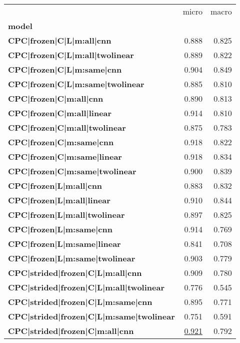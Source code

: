 \begin{adjustbox}{width=\textwidth}
\begin{tabular}{lrr}
\toprule
{} &  micro &  macro \\
\textbf{model                                               } &        &        \\
\midrule
\textbf{CPC|frozen|C|L|m:all|cnn               } &  0.888 &  0.825 \\
\textbf{CPC|frozen|C|L|m:all|twolinear         } &  0.889 &  0.822 \\
\textbf{CPC|frozen|C|L|m:same|cnn              } &  0.904 &  0.849 \\
\textbf{CPC|frozen|C|L|m:same|twolinear        } &  0.885 &  0.810 \\
\textbf{CPC|frozen|C|m:all|cnn                   } &  0.890 &  0.813 \\
\textbf{CPC|frozen|C|m:all|linear              } &  0.914 &  0.810 \\
\textbf{CPC|frozen|C|m:all|twolinear             } &  0.875 &  0.783 \\
\textbf{CPC|frozen|C|m:same|cnn                  } &  0.918 &  0.822 \\
\textbf{CPC|frozen|C|m:same|linear             } &  0.918 &  0.834 \\
\textbf{CPC|frozen|C|m:same|twolinear            } &  0.900 &  0.839 \\
\textbf{CPC|frozen|L|m:all|cnn                   } &  0.883 &  0.832 \\
\textbf{CPC|frozen|L|m:all|linear              } &  0.910 &  0.844 \\
\textbf{CPC|frozen|L|m:all|twolinear             } &  0.897 &  0.825 \\
\textbf{CPC|frozen|L|m:same|cnn                  } &  0.914 &  0.769 \\
\textbf{CPC|frozen|L|m:same|linear             } &  0.841 &  0.708 \\
\textbf{CPC|frozen|L|m:same|twolinear            } &  0.903 &  0.779 \\
\textbf{CPC|strided|frozen|C|L|m:all|cnn       } &  0.909 &  0.780 \\
\textbf{CPC|strided|frozen|C|L|m:all|twolinear } &  0.776 &  0.545 \\
\textbf{CPC|strided|frozen|C|L|m:same|cnn      } &  0.895 &  0.771 \\
\textbf{CPC|strided|frozen|C|L|m:same|twolinear} &  0.751 &  0.591 \\
\textbf{CPC|strided|frozen|C|m:all|cnn           } &  \underline{0.921} &  0.792 \\

\end{tabular}
\end{adjustbox}
